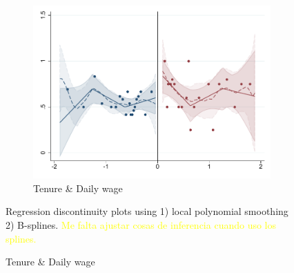 \documentclass[oneside,11pt]{article}
\begin{document}
\begin{figure}[H]
\begin{center}
\begin{subfigure}{0.31\textwidth}
\caption{Tenure \& Daily wage}
        \includegraphics[width=\textwidth]{Figuras/rdplot_conflicto_arreglado_2_4_2.pdf}
    \end{subfigure}
  \end{center}
  
    \scriptsize Regression discontinuity plots using 1) local polynomial smoothing 2) B-splines. \textcolor{yellow}{Me falta ajustar cosas de inferencia cuando uso los splines.}
\end{figure}



\end{document}
